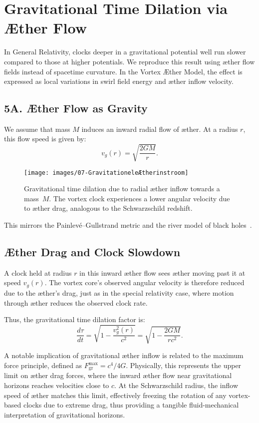 \section{Gravitational Time Dilation via Æther Flow}

In General Relativity, clocks deeper in a gravitational potential well run slower compared to those at higher potentials. We reproduce this result using æther flow fields instead of spacetime curvature. In the Vortex Æther Model, the effect is expressed as local variations in swirl field energy and æther inflow velocity.

\subsection*{5A. Æther Flow as Gravity}

We assume that mass $M$ induces an inward radial flow of æther. At a radius $r$, this flow speed is given by:
\[
v_g(r) = \sqrt{\frac{2GM}{r}}.
\]

\begin{figure}[H]
    \centering
    \texttt{[image: images/07-GravitationeleÆtherinstroom]}
    \caption{Gravitational time dilation due to radial æther inflow towards a mass~$M$. The vortex clock experiences a lower angular velocity due to æther drag, analogous to the Schwarzschild redshift.}
    \label{fig:GravitationeleÆtherinstroom}
\end{figure}

This mirrors the Painlevé–Gullstrand metric and the river model of black holes~\cite{Hamilton2004-river}.

\subsection*{Æther Drag and Clock Slowdown}

A clock held at radius $r$ in this inward æther flow sees æther moving past it at speed $v_g(r)$. The vortex core's observed angular velocity is therefore reduced due to the æther's drag, just as in the special relativity case, where motion through æther reduces the observed clock rate.

Thus, the gravitational time dilation factor is:
\begin{equation}
\frac{d\tau}{dt} = \sqrt{1 - \frac{v_g^2(r)}{c^2}} = \sqrt{1 - \frac{2GM}{rc^2}}.
\end{equation}

A notable implication of gravitational æther inflow is related to the maximum force principle, defined as $F^{\text{max}}_{\text{gr}} = c^4 /4G$. Physically, this represents the upper limit on æther drag forces, where the inward æther flow near gravitational horizons reaches velocities close to $c$. At the Schwarzschild radius, the inflow speed of æther matches this limit, effectively freezing the rotation of any vortex-based clocks due to extreme drag, thus providing a tangible fluid-mechanical interpretation of gravitational horizons.

